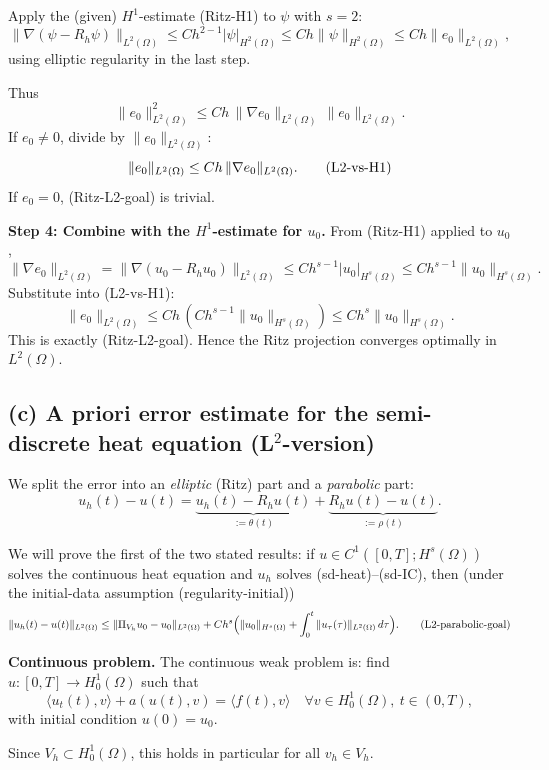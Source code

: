 Apply the (given) $H^1$-estimate (Ritz-H1) to $\psi$ with $s=2$:
\[
    \|\nabla(\psi - R_h\psi)\|_{L^2(\Omega)}
    \le C h^{2-1}|\psi|_{H^2(\Omega)}
    \le C h \|\psi\|_{H^2(\Omega)}
    \le C h \|e_0\|_{L^2(\Omega)},
\]
using elliptic regularity in the last step.

Thus
\[
    \|e_0\|_{L^2(\Omega)}^2
    \le C h\,\|\nabla e_0\|_{L^2(\Omega)}\,\|e_0\|_{L^2(\Omega)}.
\]
If $e_0\neq 0$, divide by $\|e_0\|_{L^2(\Omega)}$:
\[
    \|e_0\|_{L^2(\Omega)} \le C h\,\|\nabla e_0\|_{L^2(\Omega)}. \tag{\text{L2-vs-H1}}
\]
If $e_0=0$, (Ritz-L2-goal) is trivial.

\textbf{Step 4: Combine with the $H^1$-estimate for $u_0$.}
From (Ritz-H1) applied to $u_0$,
\[
    \|\nabla e_0\|_{L^2(\Omega)}
    = \|\nabla(u_0 - R_h u_0)\|_{L^2(\Omega)}
    \le C h^{s-1}|u_0|_{H^s(\Omega)}
    \le C h^{s-1}\|u_0\|_{H^s(\Omega)}.
\]
Substitute into (L2-vs-H1):
\[
    \|e_0\|_{L^2(\Omega)}
    \le C h\,(C h^{s-1}\|u_0\|_{H^s(\Omega)})
    \le C h^s \|u_0\|_{H^s(\Omega)}.
\]
This is exactly (Ritz-L2-goal). Hence the Ritz projection converges
optimally in $L^2(\Omega)$.

\subsection*{(c) A priori error estimate for the semi-discrete heat equation (L$^2$-version)}

We split the error into an \emph{elliptic} (Ritz) part and a \emph{parabolic} part:
\[
    u_h(t) - u(t) = \underbrace{u_h(t) - R_h u(t)}_{:=\theta(t)}
    + \underbrace{R_h u(t) - u(t)}_{:=\rho(t)}.
\]

We will prove the first of the two stated results:
if $u\in C^1([0,T];H^s(\Omega))$ solves the continuous heat equation and $u_h$ solves
(sd-heat)--(sd-IC), then (under the initial-data assumption (regularity-initial))
\[
    \|u_h(t) - u(t)\|_{L^2(\Omega)}
    \le \|\Pi_{V_h}u_0 - u_0\|_{L^2(\Omega)}
    + C h^s\Bigl(\|u_0\|_{H^s(\Omega)} + \int_0^t \|u_\tau(\tau)\|_{L^2(\Omega)}\,d\tau\Bigr). \tag{\text{L2-parabolic-goal}}
\]

\textbf{Continuous problem.}
The continuous weak problem is: find $u:[0,T]\to H_0^1(\Omega)$ such that
\[
    \langle u_t(t),v\rangle + a(u(t),v) = \langle f(t),v\rangle
    \quad\forall v\in H_0^1(\Omega),\ t\in(0,T),
\]
with initial condition $u(0)=u_0$.

Since $V_h\subset H_0^1(\Omega)$, this holds in particular for all $v_h\in V_h$.

